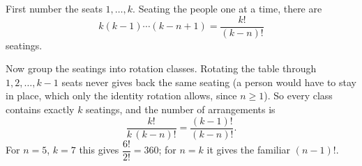 First number the seats $1,\dots,k$. Seating the people one at a time, there are
\[
k(k-1)\cdots(k-n+1)=\dfrac{k!}{(k-n)!}
\]
seatings.

Now group the seatings into rotation classes. Rotating the table through $1,2,\dots,k-1$ seats never gives back the same seating (a person would have to stay in place, which only the identity rotation allows, since $n\ge1$). So every class contains exactly $k$ seatings, and the number of arrangements is
\[
\dfrac{k!}{k\,(k-n)!}=\boxed{\dfrac{(k-1)!}{(k-n)!}}.
\]
For $n=5$, $k=7$ this gives $\dfrac{6!}{2!}=360$; for $n=k$ it gives the familiar $(n-1)!$.
